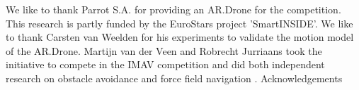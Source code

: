 We like to thank Parrot S.A. for providing an AR.Drone for the competition. This research is partly funded by the EuroStars project 'SmartINSIDE'. We like to thank Carsten van Weelden for his experiments to validate the motion model of the AR.Drone. Martijn van der Veen and Robrecht Jurriaans took the initiative to compete in the IMAV competition and did both independent research on obstacle avoidance \cite{Jurriaans2011} and force field navigation \cite{VanDerVeen2011}. Acknowledgements